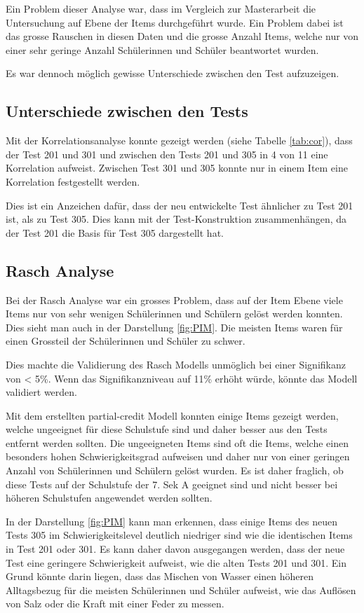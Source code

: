 Ein Problem dieser Analyse war, dass im Vergleich zur Masterarbeit die Untersuchung auf Ebene der Items durchgeführt wurde. Ein Problem dabei ist das grosse Rauschen in diesen Daten und die grosse Anzahl Items, welche nur von einer sehr geringe Anzahl Schülerinnen und Schüler beantwortet wurden.

Es war dennoch möglich gewisse Unterschiede zwischen den Test aufzuzeigen.

\subsection{Unterschiede zwischen den Tests}
Mit der Korrelationsanalyse konnte gezeigt werden (siehe Tabelle \ref{tab:cor}), dass der Test 201 und 301 und zwischen den Tests 201 und 305 in 4 von 11 eine Korrelation aufweist. Zwischen Test 301 und 305 konnte nur in einem Item eine Korrelation festgestellt werden.

Dies ist ein Anzeichen dafür, dass der neu entwickelte Test ähnlicher zu Test 201 ist, als zu Test 305. Dies kann mit der Test-Konstruktion zusammenhängen, da der Test 201 die Basis für Test 305 dargestellt hat.

\subsection{Rasch Analyse}

Bei der Rasch Analyse war ein grosses Problem, dass auf der Item Ebene viele Items nur von sehr wenigen Schülerinnen und Schülern gelöst werden konnten. Dies sieht man auch in der Darstellung \ref{fig:PIM}. Die meisten Items waren für einen Grossteil der Schülerinnen und Schüler zu schwer.

Dies machte die Validierung des Rasch Modells unmöglich bei einer Signifikanz von < 5\%. Wenn das Signifikanzniveau auf 11\% erhöht würde, könnte das Modell validiert werden. 

Mit dem erstellten partial-credit Modell konnten einige Items gezeigt werden, welche ungeeignet für diese Schulstufe sind und daher besser aus den Tests entfernt werden sollten. Die ungeeigneten Items sind oft die Items, welche einen besonders hohen Schwierigkeitsgrad aufweisen und daher nur von einer geringen Anzahl von Schülerinnen und Schülern gelöst wurden. Es ist daher fraglich, ob diese Tests auf der Schulstufe der 7. Sek A geeignet sind und nicht besser bei höheren Schulstufen angewendet werden sollten.

In der Darstellung \ref{fig:PIM} kann man erkennen, dass einige Items des neuen Tests 305 im Schwierigkeitslevel deutlich niedriger sind wie die identischen Items in Test 201 oder 301. Es kann daher davon ausgegangen werden, dass der neue Test eine geringere Schwierigkeit aufweist, wie die alten Tests 201 und 301. Ein Grund könnte darin liegen, dass das Mischen von Wasser einen höheren Alltagsbezug für die meisten Schülerinnen und Schüler aufweist, wie das Auflösen von Salz oder die Kraft mit einer Feder zu messen. 

